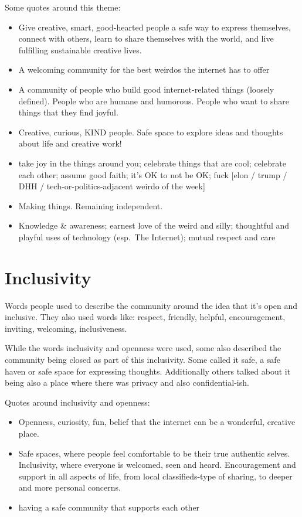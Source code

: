 \documentclass[
]{book}
\providecommand{\tightlist}{%
  \setlength{\itemsep}{0pt}\setlength{\parskip}{0pt}}
\begin{document}
Some quotes around this theme:

\begin{itemize}
\tightlist
\item
  Give creative, smart, good-hearted people a safe way to express themselves, connect with others, learn to share themselves with the world, and live fulfilling sustainable creative lives.
\item
  A welcoming community for the best weirdos the internet has to offer
\item
  A community of people who build good internet-related things (loosely defined). People who are humane and humorous. People who want to share things that they find joyful.
\item
  Creative, curious, KIND people. Safe space to explore ideas and thoughts about life and creative work!
\item
  take joy in the things around you; celebrate things that are cool; celebrate each other; assume good faith; it's OK to not be OK; fuck {[}elon / trump / DHH / tech-or-politics-adjacent weirdo of the week{]}
\item
  Making things. Remaining independent.
\item
  Knowledge \& awareness; earnest love of the weird and silly; thoughtful and playful uses of technology (esp.~The Internet); mutual respect and care
\end{itemize}

\section{Inclusivity}\label{inclusivity}

Words people used to describe the community around the idea that it's open and inclusive. They also used words like: respect, friendly, helpful, encouragement, inviting, welcoming, inclusiveness.

While the words inclusivity and openness were used, some also described the community being closed as part of this inclusivity. Some called it safe, a safe haven or safe space for expressing thoughts. Additionally others talked about it being also a place where there was privacy and also confidential-ish.

Quotes around inclusivity and openness:

\begin{itemize}
\tightlist
\item
  Openness, curiosity, fun, belief that the internet can be a wonderful, creative place.
\item
  Safe spaces, where people feel comfortable to be their true authentic selves. Inclusivity, where everyone is welcomed, seen and heard. Encouragement and support in all aspects of life, from local classifieds-type of sharing, to deeper and more personal concerns.
\item
  having a safe community that supports each other
\end{itemize}
\end{document}
